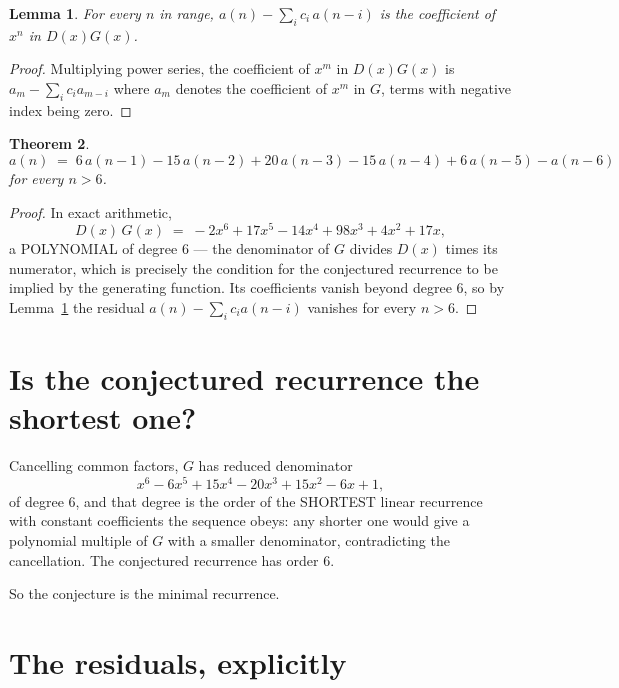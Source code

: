 \documentclass[11pt,a4paper]{article}
\theoremstyle{plain}
\newtheorem{theorem}{Theorem}
\newtheorem{lemma}[theorem]{Lemma}
\theoremstyle{definition}
\begin{document}
\begin{lemma}\label{lem:key}
For every $n$ in range, $a(n)-\sum_i c_i\,a(n-i)$ is the coefficient of $x^{n}$ in
$D(x)G(x)$.
\end{lemma}

\begin{proof}
Multiplying power series, the coefficient of $x^{m}$ in $D(x)G(x)$ is
$a_m-\sum_i c_i a_{m-i}$ where $a_m$ denotes the coefficient of $x^{m}$ in $G$, terms with
negative index being zero.
\end{proof}

\begin{theorem}
\[
a(n)\;=\;6\,a(n-1) - 15\,a(n-2) + 20\,a(n-3) - 15\,a(n-4) + 6\,a(n-5) - a(n-6)
\]
for every $n>6$.
\end{theorem}

\begin{proof}
In exact arithmetic,
\[
D(x)\,G(x)\;=\;- 2 x^{6} + 17 x^{5} - 14 x^{4} + 98 x^{3} + 4 x^{2} + 17 x,
\]
a POLYNOMIAL of degree $6$ --- the denominator of $G$ divides $D(x)$ times its numerator,
which is precisely the condition for the conjectured recurrence to be implied by the
generating function. Its coefficients vanish beyond degree $6$, so by
Lemma~\ref{lem:key} the residual $a(n)-\sum_ic_ia(n-i)$ vanishes for every
$n>6$.
\end{proof}

\section{Is the conjectured recurrence the shortest one?}

Cancelling common factors, $G$ has reduced denominator
\[
x^{6} - 6 x^{5} + 15 x^{4} - 20 x^{3} + 15 x^{2} - 6 x + 1,
\]
of degree $6$, and that degree is the order of the SHORTEST linear recurrence with
constant coefficients the sequence obeys: any shorter one would give a polynomial multiple of
$G$ with a smaller denominator, contradicting the cancellation. The conjectured recurrence has
order $6$.

So the conjecture is the minimal recurrence.

\section{The residuals, explicitly}
\end{document}
